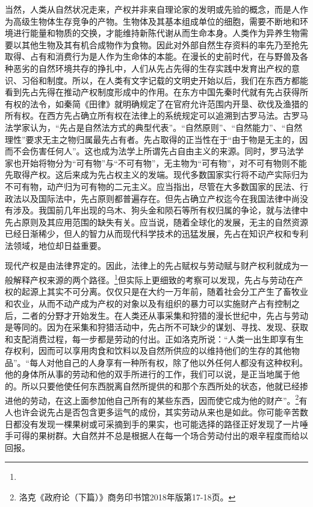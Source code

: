 \documentclass[lang=cn,12pt,a4paper]{elegantpaper}
\begin{document}
当然，人类从自然状况走来，产权并非来自理论家的发明或先验的概念，而是人作为高级生物体生存竞争的产物。生物体及其基本组成单位的细胞，需要不断地和环境进行能量和物质的交换，才能维持新陈代谢从而生命本身。人类作为异养生物需要以其他生物及其有机合成物作为食物。因此对外部自然生存资料的率先乃至抢先取得、占有和消费行为是人作为生命体的本能。在漫长的史前时代，在与野兽及各种恶劣的自然环境共存的挣扎中，人们从先占先得的生存实践中发育出产权的意识、习俗和制度。所以，在人类有文字记载的文明史开始以后，我们在东西方都能看到先占先得在推动产权制度形成中的作用。在东方中国先秦时代就有先占获得所有权的法令，如秦简《田律》就明确规定了在官府允许范围内开垦、砍伐及渔猎的所有权。在西方先占确立所有权在法律上的系统规定可以追溯到古罗马法。古罗马法学家认为，``先占是自然法方式的典型代表''。``自然原则''、``自然能力''、``自然理性''要求无主之物归属最先占有者。先占取得的正当性在于``由于物是无主的，因而不会伤害任何人''。这也成为法学上所谓先占自由主义的来源。同时，罗马法学家也开始将物分为``可有物''与``不可有物''，无主物为``可有物''，对不可有物则不能先取得产权。这后来成为先占权主义的发端。现代多数国家实行将不动产实际归为不可有物，动产归为可有物的二元主义。应当指出，尽管在大多数国家的民法、行政法以及国际法中，先占原则都普遍存在。但先占确立产权迄今在我国法律中尚没有涉及。我国前几年出现的乌木、狗头金和陨石等所有权归属的争论，就与法律中先占原则及其应用范围的缺失有关。应当说，随着全球化的发展，无主的自然资源已经日渐稀少，但人的智力从而现代科学技术的迅猛发展，先占在知识产权和专利法领域，地位却日益重要。

现代产权是由法律界定的。因此，法律上的先占赋权与劳动赋与财产权利就成为一般解释产权来源的两个路径。\footnote{}但实际上更细致的考察可以发现，先占与劳动在产权的起源上其实不可分离。仅仅只是在大约一万年前，随着社会分工产生了畜牧业和农业，从而不动产成为产权的对象以及有组织的暴力可以实施财产占有控制之后，二者的分野才开始发生。在人类还从事采集和狩猎的漫长世纪中，先占与劳动是等同的。因为在采集和狩猎活动中，先占所不可缺少的谋划、寻找、发现、获取和支配消费过程，每一步都是劳动的付出。正如洛克所说：``人类一出生即享有生存权利，因而可以享用肉食和饮料以及自然所供应的以维持他们的生存的其他物品''。``每人对他自己的人身享有一种所有权，除了他以外任何人都没有这种权利。他的身体所从事的劳动和他的双手所进行的工作，我们可以说，是正当地属于他的。所以只要他使任何东西脱离自然所提供的和那个东西所处的状态，他就已经掺进他的劳动，在这上面参加他自己所有的某些东西，因而使它成为他的财产''。\footnote{洛克《政府论（下篇）》商务印书馆2018年版第17-18页。}有人也许会说先占是否包含更多运气的成份，其实劳动从来也是如此。你可能辛苦数日都没有发现一棵果树或可采摘到手的果实，也可能选择的路径正好发现了一片唾手可得的果树群。大自然并不总是根据人在每一个场合劳动付出的艰辛程度而给以回报。
\end{document}

